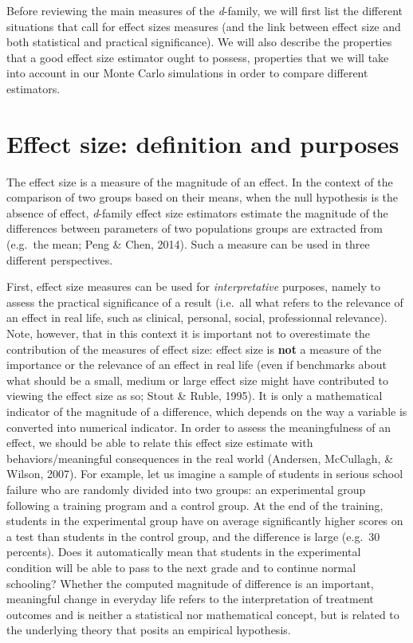 \documentclass[
  english,
  man,floatsintext]{apa6}
\begin{document}
Before reviewing the main measures of the \emph{d}-family, we will first list the different situations that call for effect sizes measures (and the link between effect size and both statistical and practical significance). We will also describe the properties that a good effect size estimator ought to possess, properties that we will take into account in our Monte Carlo simulations in order to compare different estimators.

\hypertarget{effect-size-definition-and-purposes}{%
\section{Effect size: definition and purposes}\label{effect-size-definition-and-purposes}}

The effect size is a measure of the magnitude of an effect. In the context of the comparison of two groups based on their means, when the null hypothesis is the absence of effect, \emph{d}-family effect size estimators estimate the magnitude of the differences between parameters of two populations groups are extracted from (e.g.~the mean; Peng \& Chen, 2014). Such a measure can be used in three different perspectives.

First, effect size measures can be used for \emph{interpretative} purposes, namely to assess the practical significance of a result (i.e.~all what refers to the relevance of an effect in real life, such as clinical, personal, social, professionnal relevance). Note, however, that in this context it is important not to overestimate the contribution of the measures of effect size: effect size is \textbf{not} a measure of the importance or the relevance of an effect in real life (even if benchmarks about what should be a small, medium or large effect size might have contributed to viewing the effect size as so; Stout \& Ruble, 1995). It is only a mathematical indicator of the magnitude of a difference, which depends on the way a variable is converted into numerical indicator. In order to assess the meaningfulness of an effect, we should be able to relate this effect size estimate with behaviors/meaningful consequences in the real world (Andersen, McCullagh, \& Wilson, 2007). For example, let us imagine a sample of students in serious school failure who are randomly divided into two groups: an experimental group following a training program and a control group. At the end of the training, students in the experimental group have on average significantly higher scores on a test than students in the control group, and the difference is large (e.g.~30 percents). Does it automatically mean that students in the experimental condition will be able to pass to the next grade and to continue normal schooling? Whether the computed magnitude of difference is an important, meaningful change in everyday life refers to the interpretation of treatment outcomes and is neither a statistical nor mathematical concept, but is related to the underlying theory that posits an empirical hypothesis.
\end{document}
